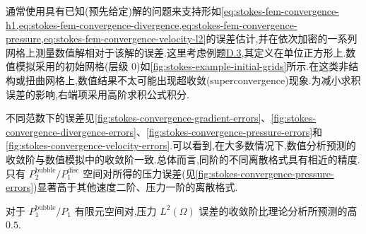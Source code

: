 \begin{example}[支持误差估计的解析例题]\label{ex:stokes-error-estimates-analytical-example}\label{ex:stokes-convergence}
通常使用具有已知(预先给定)解的问题来支持形如\cref{eq:stokes-fem-convergence-h1,eq:stokes-fem-convergence-divergence,eq:stokes-fem-convergence-pressure,eq:stokes-fem-convergence-velocity-l2}的误差估计,并在依次加密的一系列网格上测量数值解相对于该解的误差.这里考虑例题\hyperref[ex:appendix-d-3]{D.3},其定义在单位正方形上.数值模拟采用的初始网格(层级 0)如\cref{fig:stokes-example-initial-grids}所示.在这类非结构或扭曲网格上,数值结果不太可能出现超收敛(superconvergence)现象.为减小求积误差的影响,右端项采用高阶求积公式积分.

不同范数下的误差见\cref{fig:stokes-convergence-gradient-errors}、\cref{fig:stokes-convergence-divergence-errors}、\cref{fig:stokes-convergence-pressure-errors}和\cref{fig:stokes-convergence-velocity-errors}\footnotemark.可以看到,在大多数情况下,数值分析预测的收敛阶与数值模拟中的收敛阶一致.总体而言,同阶的不同离散格式具有相近的精度.只有 $P_2^{\mathrm{bubble}}/P_1^{\mathrm{disc}}$ 空间对所得的压力误差(见\cref{fig:stokes-convergence-pressure-errors})显著高于其他速度二阶、压力一阶的离散格式.

对于 $P_1^{\mathrm{bubble}}/P_1$ 有限元空间对,压力 $L^2(\Omega)$ 误差的收敛阶比理论分析所预测的高 $0.5$.
\end{example}

